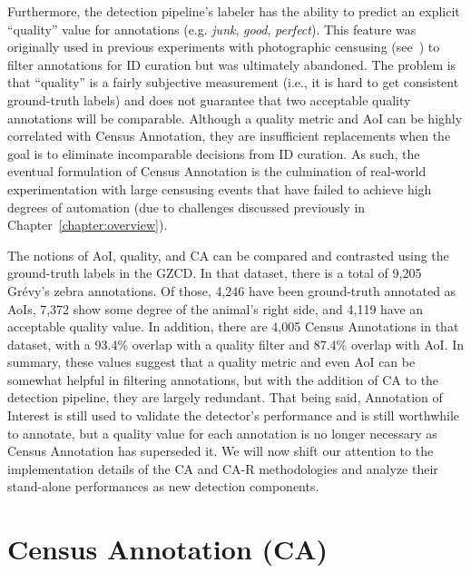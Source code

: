 Furthermore, the detection pipeline's labeler has the ability to predict an explicit ``quality'' value for annotations (e.g. \textit{junk}, \textit{good}, \textit{perfect}).  This feature was originally used in previous experiments with photographic censusing (see~\cite{parham_photographic_2015}) to filter annotations for ID curation but was ultimately abandoned.  The problem is that ``quality'' is a fairly subjective measurement (i.e., it is hard to get consistent ground-truth labels) and does not guarantee that two acceptable quality annotations will be comparable.  Although a quality metric and AoI can be highly correlated with Census Annotation, they are insufficient replacements when the goal is to eliminate incomparable decisions from ID curation.  As such, the eventual formulation of Census Annotation is the culmination of real-world experimentation with large censusing events that have failed to achieve high degrees of automation (due to challenges discussed previously in Chapter~\ref{chapter:overview}).

The notions of AoI, quality, and CA can be compared and contrasted using the ground-truth labels in the GZCD.  In that dataset, there is a total of 9,205 Gr\'evy's zebra annotations.  Of those, 4,246 have been ground-truth annotated as AoIs, 7,372 show some degree of the animal's right side, and 4,119 have an acceptable quality value. In addition, there are 4,005 Census Annotations in that dataset, with a 93.4\% overlap with a quality filter and 87.4\% overlap with AoI.  In summary, these values suggest that a quality metric and even AoI can be somewhat helpful in filtering annotations, but with the addition of CA to the detection pipeline, they are largely redundant.  That being said, Annotation of Interest is still used to validate the detector's performance and is still worthwhile to annotate, but a quality value for each annotation is no longer necessary as Census Annotation has superseded it.  We will now shift our attention to the implementation details of the CA and CA-R methodologies and analyze their stand-alone performances as new detection components.

\section{Census Annotation (CA)} \label{sec:ca}

